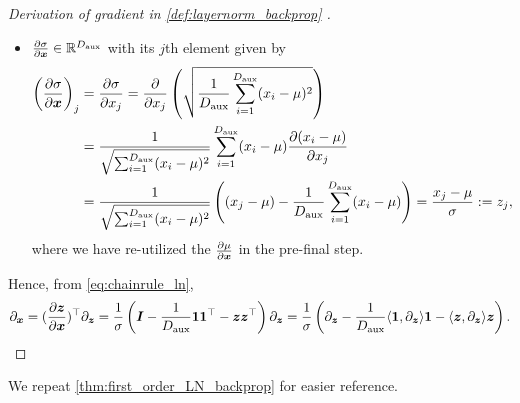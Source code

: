 \begin{proof}[Derivation of gradient in \cref{def:layernorm_backprop} ]
\begin{itemize}
    \item $\frac{\partial \sigma}{ \partial {\bm{x}} } \in \mathbb{R}^{D_{\text{aux}}}$ with its $j$th element given by 
    \begin{align*}
        \left(\frac{\partial \sigma}{ \partial {\bm{x}} }\right)_j &= \frac{\partial \sigma}{ \partial x_j } = \frac{\partial   }{ \partial x_j } \left( \sqrt{ \frac{1}{ D_{\text{aux}} } \sum_{i=1}^{D_{\text{aux}}} (x_i - \mu)^2 }\right) \\&=  \frac{1}{ \sqrt{\sum_{i=1}^{D_{\text{aux}}} (x_i - \mu)^2 } } \sum_{i=1}^{D_{\text{aux}}} (x_i - \mu) \frac{\partial (x_i - \mu)}{\partial x_j} \\& = \frac{1}{ \sqrt{\sum_{i=1}^{D_{\text{aux}}} (x_i - \mu)^2 } } \left(  (x_j - \mu) - \frac{1}{ D_{\text{aux}} } \sum_{i=1}^{ D_{\text{aux}} } (x_i - \mu) \right) 
        = \frac{ x_j - \mu }{ \sigma } := z_j,
    \end{align*}
    where we have re-utilized the $\frac{\partial \mu}{ \partial {\bm{x}} }$ in the pre-final step.
\end{itemize}


Hence, from \cref{eq:chainrule_ln}, 
\begin{align*}
\partial_{{\bm{x}}} = (\frac{\partial {\bm{z}}}{ \partial {\bm{x}}})^{\top} \partial_{ {\bm{z}} } 
    =   \frac{1}{\sigma} \left( {\bm{I}} - \frac{ 1 }{ D_{\text{aux}} } \mathbf{1} \mathbf{1}^{\top} - {\bm{z}} {\bm{z}}^{\top} \right) \partial_{ {\bm{z}} } = \frac{1}{\sigma} \left( \partial_{{\bm{z}}} - \frac{ 1 }{ D_{\text{aux}} }  \langle \mathbf{1}, \partial_{{\bm{z}}}  \rangle  \mathbf{1} -  \langle {\bm{z}}, \partial_{{\bm{z}}}  \rangle {\bm{z}} \right).
\end{align*}    

\end{proof}

We repeat \cref{thm:first_order_LN_backprop} for easier reference. 
\firstorderLNbackprop*

